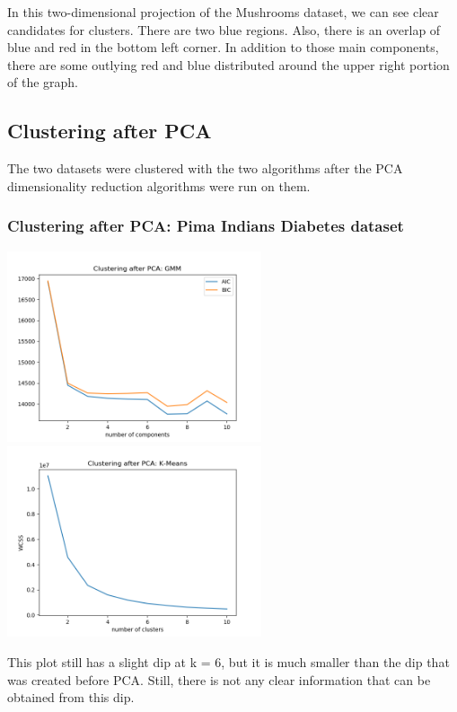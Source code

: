 \documentclass[11pt]{article}
\begin{document}
            In this two-dimensional projection of the Mushrooms dataset, we can see clear candidates for clusters.
            There are two blue regions. Also, there is an overlap of blue and red in the bottom left corner. In addition
            to those main components, there are some outlying red and blue distributed around the upper right portion
            of the graph.

            \subsection{Clustering after PCA}

            The two datasets were clustered with the two algorithms
            after the PCA dimensionality reduction algorithms were run
            on them.

            \subsubsection{Clustering after PCA: Pima Indians Diabetes dataset}

            \includegraphics[width=7.5cm]{../pima/clustering2/gmm_pca.png}
            \includegraphics[width=7.5cm]{../pima/clustering2/km_pca.png}

            This plot still has a slight dip at k = 6, but it is much smaller
            than the dip that was created before PCA. Still, there is not any clear
            information that can be obtained from this dip.
\end{document}
